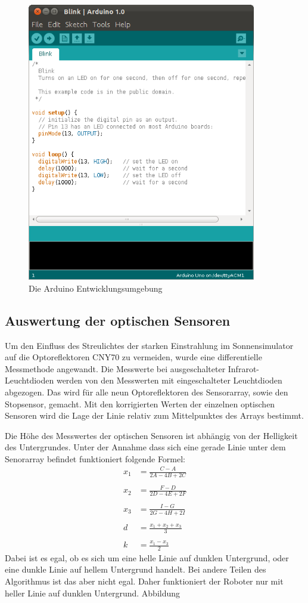 \documentclass[a4paper,bibtotoc,oneside]{scrbook}
\begin{document}
\begin{figure}[htbp]
\centering
\includegraphics[width=100mm]{img/Arduino.png}
\caption{Die Arduino Entwicklungsumgebung}\label{ardu2}
\end{figure}

\subsection{Auswertung der optischen Sensoren}\thispagestyle{empty}
Um den Einfluss des Streulichtes der starken Einstrahlung im Sonnensimulator auf die Optoreflektoren CNY70 zu vermeiden, wurde eine differentielle Messmethode angewandt. Die Messwerte bei ausgeschalteter Infrarot-Leuchtdioden werden von den Messwerten mit eingeschalteter Leuchtdioden abgezogen.
Das wird für alle neun Optoreflektoren des Sensorarray, sowie den Stopsensor, gemacht.
Mit den korrigierten Werten der einzelnen optischen Sensoren wird die Lage der Linie relativ zum Mittelpunktes des Arrays bestimmt. 

Die Höhe des Messwertes  der optischen Sensoren ist abhängig von der Helligkeit des Untergrundes. Unter der Annahme dass sich eine gerade Linie unter dem Senorarray befindet funktioniert folgende Formel:
\begin{align*}
  x_1 &= \frac{C-A}{2A-4B+2C} \\
  \\
  x_2 &=  \frac{F-D}{2D-4E+2F} \\
  \\
  x_3 &=  \frac{I-G}{2G-4H+2I} \\
  \\
  d &=  \frac{x_1+x_2+x_3}{3} \\
  \\
  k &=  \frac{x_1-x_3}{2}
\end{align*}
Dabei ist es egal, ob es sich um eine helle Linie auf dunklen Untergrund, oder eine dunkle Linie auf hellem Untergrund handelt. Bei andere Teilen des Algorithmus ist das aber nicht egal. Daher funktioniert der Roboter nur mit heller Linie auf dunklen Untergrund.  Abbildung 
\end{document}
